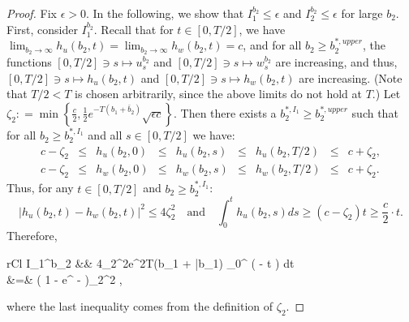 \documentclass[11pt]{article}
\begin{document}
\begin{proof}
	Fix $\epsilon>0$. In the following, we show that $I_1^{b_2} \leq \epsilon$ and $I_2^{b_2} \leq \epsilon$ for large $b_2$. First, consider $I_1^{b_2}$. Recall that for $t \in[0,T/2]$, we have $\lim_{b_2 \to \infty}h_u(b_2,t) = \lim_{b_2 \to \infty}h_w(b_2,t) = c$, and for all $b_2 \geq b_2^{*,upper}$, the functions $[0,T/2] \ni s \mapsto u_s^{b_2}$ and $[0,T/2] \ni s \mapsto w_s^{b_2}$ are increasing, and thus, $[0,T/2] \ni s \mapsto h_u(b_2,t)$ and $[0,T/2] \ni s \mapsto h_w(b_2,t)$ are increasing. (Note that $T/2<T$ is chosen arbitrarily, since the above limits do not hold at $T$.) Let
	$ \zeta_2: = \min \left\{ \frac{c}{2},  \frac{1}{2} e^{-T(b_1+\bar{b}_2)} \sqrt{\epsilon c} \right\}.$
	Then there exists a $b_2^{*,I_1}  \geq b_2^{*,upper}$ such that for all $b_2 \geq b_2^{*,I_1}$ and all $s\in [0, T/2]$ we have:
	\begin{equation*}
	\begin{array}{lclclclcl}
		c - \zeta_2 &\leq& h_u(b_2,0) &\leq& h_u(b_2,s) &\leq& h_u(b_2, T/2 ) &\leq& c + \zeta_2, \\
		c - \zeta_2 &\leq& h_w(b_2,0) &\leq& h_w(b_2,s) &\leq& h_w(b_2, T/2 ) &\leq& c + \zeta_2.
	\end{array}
	\end{equation*}
	Thus, for any $t \in [0,T/2]$ and $b_2 \geq b_2^{*,I_1}$:
	$$
		\left\vert h_u(b_2, t) - h_w(b_2,t) \right\vert^2 \leq  4 \zeta_2^2 \quad \text{and} \quad \int_0^t h_u(b_2,s)ds \geq (c - \zeta_2) t \geq \frac{c}{2}\cdot t.
	$$
	Therefore,
	\begin{IEEEeqnarray}{rCl}
		I_1^{b_2} &\leq& 4\zeta_2^2e^{2T(b_1 + \bar{b}_1)} \cdot{} \int_0^{} \exp \left(  -  \cdot {}\cdot t \right) dt \nonumber \\
		&=&  \left( 1 - e^{ -    } \right)\zeta_2^2 \leq \epsilon, 
	\label{eq:I1_ineq_b2_infinity}
	\end{IEEEeqnarray}
	where the last inequality comes from the definition of $\zeta_2$.
	

\end{proof}
\end{document}
